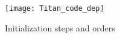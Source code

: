 \begin{figure}
\centering
\texttt{[image: Titan\_code\_dep]}
\caption{\label{titan_code_dep}Initialization steps and orders}
\end{figure}
